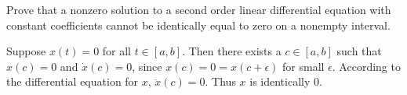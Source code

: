 \documentclass{ximera}
\begin{document}
\begin{exercise} \label{c6.7.3}
Prove that a nonzero solution to a second order linear differential equation
with constant coefficients cannot be identically equal to zero on a nonempty
interval.

\begin{solution}

Suppose $x(t) = 0$ for all $t \in [a,b]$.  Then there exists a 
$c \in [a,b]$ such that $x(c) = 0$ and $\dot{x}(c) = 0$, since $x(c) =
0 = x(c + \epsilon)$ for small $\epsilon$.  According to the differential
equation for $x$, $\ddot{x}(c) = 0$.  Thus $x$ is identically $0$.

\end{solution}
\end{exercise}
\end{document}
